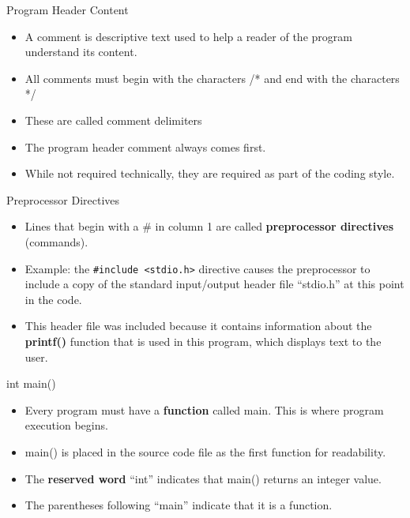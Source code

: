 \documentclass[graphics]{beamer}
\begin{document}
\begin{frame}{Program Header Content}
    \begin{itemize}
        \item A comment is descriptive text used to help a reader of the program understand its content.
        \item All comments must begin with the characters  /*  and end with the characters  */
        \item These are called comment delimiters
        \item The program header comment always comes first.
        \item While not required technically, they are required as part of the coding style.
    \end{itemize}
\end{frame}

\begin{frame}[fragile]{Preprocessor Directives}
    \begin{itemize}
        \item Lines that begin with a \# in column 1 are called \textbf{preprocessor directives} (commands).
        \item Example: the \texttt{\#include <stdio.h>} directive causes the preprocessor to include a copy of the standard input/output header file ``stdio.h'' at this point in the code.
        \item This header file was included because it contains information about the \textbf{printf()} function that is used in this program, which displays text to the user.
    \end{itemize}
\end{frame}

\begin{frame}{int main()}
    \begin{itemize}
        \item Every program must have a \textbf{function} called main. This is where program execution begins.
        \item main() is placed in the source code file as the first function for readability.
        \item The \textbf{reserved word} ``int'' indicates that main() returns an integer value.
        \item The parentheses following ``main'' indicate that it is a function.
    \end{itemize}
\end{frame}
\end{document}
